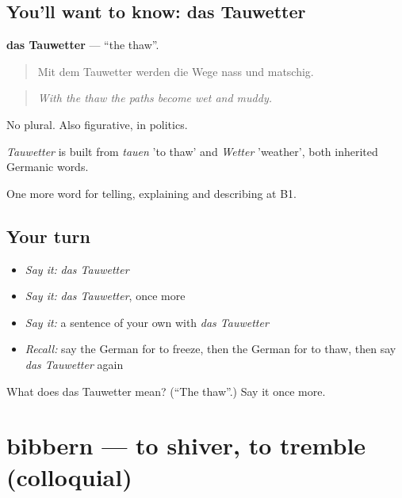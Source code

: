 \subsection*{You'll want to know: das Tauwetter}
\textbf{das Tauwetter} — \textquotedblleft{}the thaw\textquotedblright{}.

\begin{quote}
Mit dem Tauwetter werden die Wege nass und matschig.
\end{quote}

\begin{quote}
\emph{With the thaw the paths become wet and muddy.}
\end{quote}

No plural. Also figurative, in politics.

\begin{cousinweb}
\emph{Tauwetter} is built from \emph{tauen} 'to thaw' and \emph{Wetter} 'weather', both inherited Germanic words.
\end{cousinweb}

\begin{grammarlens}[title={What you've built}]
One more word for telling, explaining and describing at B1.
\end{grammarlens}

\subsection*{Your turn}
\begin{itemize}
\raggedright
  \item \emph{Say it:} \emph{das Tauwetter}
  \item \emph{Say it:} \emph{das Tauwetter}, once more
  \item \emph{Say it:} a sentence of your own with \emph{das Tauwetter}
  \item \emph{Recall:} say the German for to freeze, then the German for to thaw, then say \emph{das Tauwetter} again
\end{itemize}

\begin{tcolorbox}[breakable,colback=teal!4,colframe=teal!35!black,title={Before you move on}]
What does das Tauwetter mean? (\textquotedblleft{}The thaw\textquotedblright{}.) Say it once more.
\end{tcolorbox}
\section[bibbern]{bibbern — to shiver, to tremble (colloquial)}

